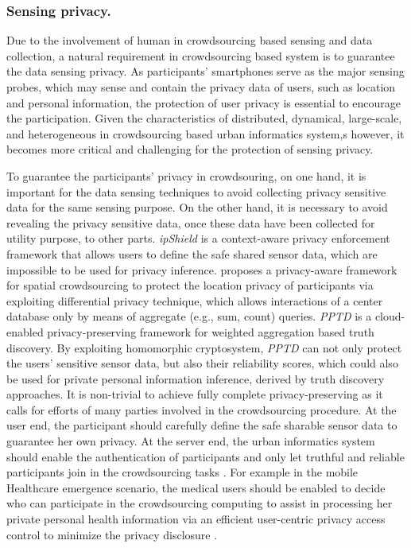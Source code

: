 \subsubsection{\textbf{Sensing privacy.}} Due to the involvement of human in crowdsourcing based sensing and data collection, a natural requirement in crowdsourcing based system is to guarantee the data sensing privacy. As participants' smartphones serve as the major sensing probes, which may sense and contain the privacy data of users, such as location and personal information, the protection of user privacy is essential to encourage the participation. Given the characteristics of distributed, dynamical, large-scale, and heterogeneous in crowdsourcing based urban informatics system,s however, it becomes more critical and challenging for the protection of sensing privacy. 

To guarantee the participants' privacy in crowdsouring, on one hand, it is important for the data sensing techniques to avoid collecting privacy sensitive data for the same sensing purpose. On the other hand, it is necessary to avoid revealing the privacy sensitive data, once these data have been collected for utility purpose, to other parts. \textit{ipShield} \cite{ipshield} is a context-aware privacy enforcement framework that allows users to define the safe shared sensor data, which are impossible to be used for privacy inference. \cite{framework} proposes a privacy-aware framework for spatial crowdsourcing to protect the location privacy of participants via exploiting differential privacy technique, which allows interactions of a center database only by means of aggregate (e.g., sum, count) queries. \textit{PPTD} \cite{pptd} is a cloud-enabled privacy-preserving framework for weighted aggregation based truth discovery. By exploiting homomorphic cryptosystem, \textit{PPTD} can not only protect the users' sensitive sensor data, but also their reliability scores, which could also be used for private personal information inference, derived by truth discovery approaches. It is non-trivial to achieve fully complete privacy-preserving as it calls for efforts of many parties involved in the crowdsourcing procedure. At the user end, the participant should carefully define the safe sharable sensor data to guarantee her own privacy. At the server end, the urban informatics system should enable the authentication of participants and only let truthful and reliable participants join in the crowdsourcing tasks \cite{security}. For example in the mobile Healthcare emergence scenario, the medical users should be enabled to decide who can participate in the crowdsourcing computing to assist in processing her private personal health information via an efficient user-centric privacy access control to minimize the privacy disclosure \cite{spoc}.

